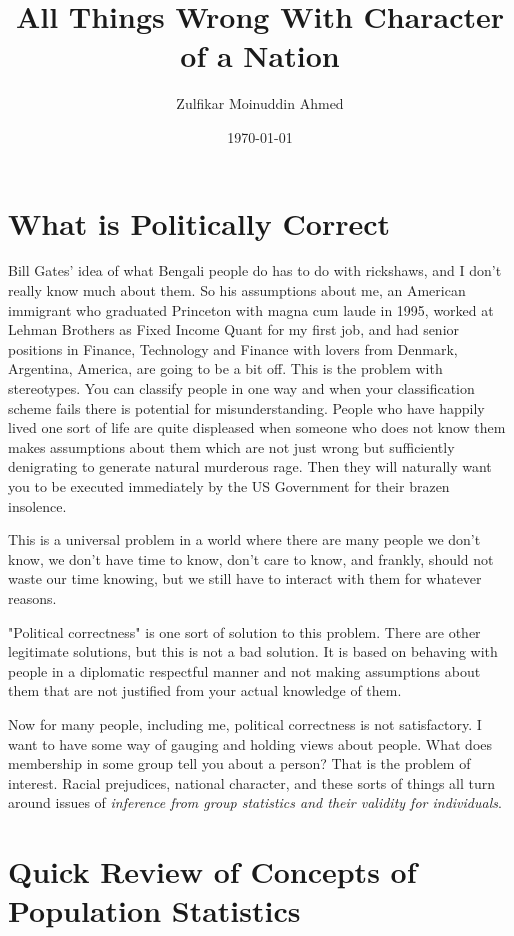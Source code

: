 \documentclass{amsart}
\title{All Things Wrong With Character of a Nation}
\author{Zulfikar Moinuddin Ahmed}
\date{\today}
\begin{document}
\maketitle

\section{What is Politically Correct}
Bill Gates' idea of what Bengali people do has to do with rickshaws, and I don't really know much about them.  So his assumptions about me, an American immigrant who graduated Princeton with magna cum laude in 1995, worked at Lehman Brothers as Fixed Income Quant for my first job, and had senior positions in Finance, Technology and Finance with lovers from Denmark, Argentina, America, are going to be a bit off.  This is the problem with stereotypes.  You can classify people in one way and when your classification scheme fails there is potential for misunderstanding.  People who have happily lived one sort of life are quite displeased when someone who does not know them makes assumptions about them which are not just wrong but sufficiently denigrating to generate natural murderous rage.  Then they will naturally want you to be executed immediately by the US Government for their brazen insolence.

This is a universal problem in a world where there are many people we don't know, we don't have time to know, don't care to know, and frankly, should not waste our time knowing, but we still have to interact with them for whatever reasons.  

"Political correctness" is one sort of solution to this problem.  There are other legitimate solutions, but this is not a bad solution.  It is based on behaving with people in a diplomatic respectful manner and not making assumptions about them that are not justified from your actual knowledge of them.

Now for many people, including me, political correctness is not satisfactory.  I want to have some way of gauging and holding views about people.  What does membership in some group tell you about a person?  That is the problem of interest.  Racial prejudices, national character, and these sorts of things all turn around issues of {\em inference from group statistics and their validity for individuals}.   

\section{Quick Review of Concepts of Population Statistics}
\end{document}
